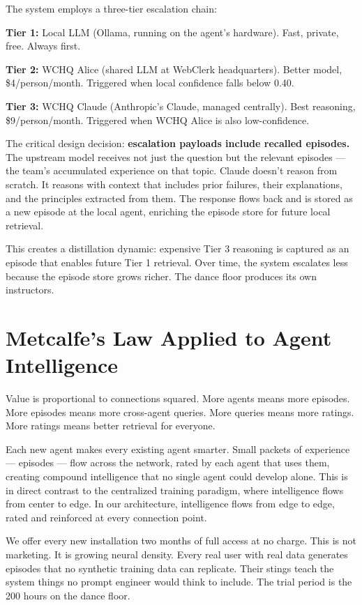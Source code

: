\documentclass[11pt,a4paper]{article}
\begin{document}
The system employs a three-tier escalation chain:

\textbf{Tier 1:} Local LLM (Ollama, running on the agent's hardware). Fast, private, free. Always first.

\textbf{Tier 2:} WCHQ Alice (shared LLM at WebClerk headquarters). Better model, \$4/person/month. Triggered when local confidence falls below 0.40.

\textbf{Tier 3:} WCHQ Claude (Anthropic's Claude, managed centrally). Best reasoning, \$9/person/month. Triggered when WCHQ Alice is also low-confidence.

The critical design decision: \textbf{escalation payloads include recalled episodes.} The upstream model receives not just the question but the relevant episodes --- the team's accumulated experience on that topic. Claude doesn't reason from scratch. It reasons with context that includes prior failures, their explanations, and the principles extracted from them. The response flows back and is stored as a new episode at the local agent, enriching the episode store for future local retrieval.

This creates a distillation dynamic: expensive Tier 3 reasoning is captured as an episode that enables future Tier 1 retrieval. Over time, the system escalates less because the episode store grows richer. The dance floor produces its own instructors.

\section{Metcalfe's Law Applied to Agent Intelligence}

Value is proportional to connections squared. More agents means more episodes. More episodes means more cross-agent queries. More queries means more ratings. More ratings means better retrieval for everyone.

Each new agent makes every existing agent smarter. Small packets of experience --- episodes --- flow across the network, rated by each agent that uses them, creating compound intelligence that no single agent could develop alone. This is in direct contrast to the centralized training paradigm, where intelligence flows from center to edge. In our architecture, intelligence flows from edge to edge, rated and reinforced at every connection point.

We offer every new installation two months of full access at no charge. This is not marketing. It is growing neural density. Every real user with real data generates episodes that no synthetic training data can replicate. Their stings teach the system things no prompt engineer would think to include. The trial period is the 200 hours on the dance floor.
\end{document}
